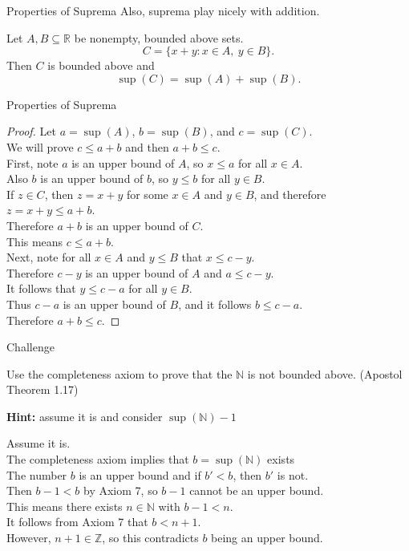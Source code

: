 \documentclass{beamer}
\begin{document}
\begin{frame}{Properties of Suprema}
Also, suprema play nicely with addition.
\begin{thm}
Let $A,B\subseteq\mathbb{R}$ be nonempty, bounded above sets.
$$C = \{x+y: x\in A,\ y\in B\}.$$
Then $C$ is bounded above and
$$\sup(C) = \sup(A) + \sup(B).$$
\end{thm}
\end{frame}
\begin{frame}{Properties of Suprema}
\begin{proof}
Let $a = \sup(A)$, $b = \sup(B)$, and $c=\sup(C)$. \\
\pause
We will prove $c \leq a+b$ and then $a+b\leq c$. \\
\pause
First, note $a$ is an upper bound of $A$, so $x\leq a$ for all $x\in A$. \\
\pause
Also $b$ is an upper bound of $b$, so $y\leq b$ for all $y\in B$. \\
\pause
If $z\in C$, then $z=x+y$ for some $x\in A$ and $y\in B$, and therefore $z = x+y \leq a+b$. \\
\pause
Therefore $a+b$ is an upper bound of $C$. \\
\pause
This means $c\leq a+b$. \\
\pause
Next, note for all $x\in A$ and $y\leq B$ that $x\leq c-y$. \\
\pause
Therefore $c-y$  is an upper bound of $A$ and $a\leq c-y$. \\
\pause
It follows that $y\leq c-a$ for all $y\in B$. \\
\pause
Thus $c-a$ is an upper bound of $B$, and it follows $b\leq c-a$. \\
\pause
Therefore $a+b\leq c$.
\end{proof}
\end{frame}


\begin{frame}{Challenge}
\begin{prob}
Use the completeness axiom to prove that the $\mathbb N$ is not bounded above.
(Apostol Theorem 1.17)
\end{prob}
\pause
\textbf{Hint:} assume it is and consider $\sup(\mathbb N)-1$
\pause
\begin{soln}
Assume it is.\\\pause
The completeness axiom implies that $b=\sup(\mathbb N)$ exists\\\pause
The number $b$ is an upper bound and if $b' < b$, then $b'$ is not.\\\pause
Then $b-1 < b$ by Axiom 7, so $b-1$ cannot be an upper bound.\\\pause
This means there exists $n\in\mathbb N$ with $b-1 < n$.\\\pause
It follows from Axiom 7 that $b < n+1$.\\\pause
However, $n+1\in\mathbb{Z}$, so this contradicts $b$ being an upper bound.
\end{soln}
\end{frame}
\end{document}
